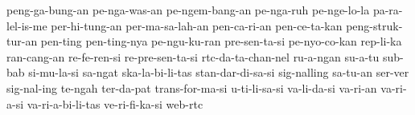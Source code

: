 {    peng-ga-bung-an pe-nga-was-an pe-ngem-bang-an
    pe-nga-ruh pe-nge-lo-la pa-ra-lel-is-me per-hi-tung-an per-ma-sa-lah-an
    pen-ca-ri-an pen-ce-ta-kan peng-struk-tur-an pen-ting pen-ting-nya pe-ngu-ku-ran
    pre-sen-ta-si pe-nyo-co-kan
    rep-li-ka
    ran-cang-an re-fe-ren-si re-pre-sen-ta-si
    rtc-da-ta-chan-nel
    ru-a-ngan
    su-a-tu
    sub-bab si-mu-la-si sa-ngat ska-la-bi-li-tas
    stan-dar-di-sa-si sig-nalling
    sa-tu-an
    ser-ver
    sig-nal-ing
    te-ngah
    ter-da-pat
    trans-for-ma-si
    u-ti-li-sa-si
    va-li-da-si va-ri-an va-ri-a-si va-ri-a-bi-li-tas ve-ri-fi-ka-si
    web-rtc
}
